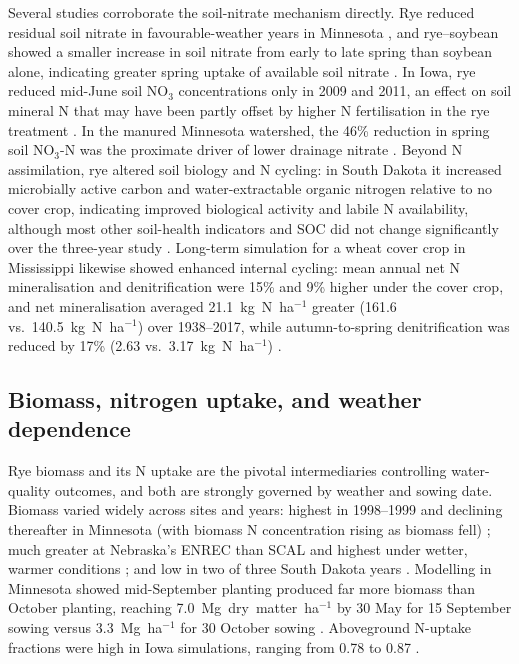 \documentclass[11pt]{article}
\begin{document}
Several studies corroborate the soil-nitrate mechanism directly. Rye reduced residual soil nitrate in favourable-weather years in Minnesota \parencite{Strock2004}, and rye--soybean showed a smaller increase in soil nitrate from early to late spring than soybean alone, indicating greater spring uptake of available soil nitrate \parencite{Qi2011b}. In Iowa, rye reduced mid-June soil NO$_3$ concentrations only in 2009 and 2011, an effect on soil mineral N that may have been partly offset by higher N fertilisation in the rye treatment \parencite{MartinezFeria2016}. In the manured Minnesota watershed, the 46\% reduction in spring soil NO$_3$-N was the proximate driver of lower drainage nitrate \parencite{Krueger2013}. Beyond N assimilation, rye altered soil biology and N cycling: in South Dakota it increased microbially active carbon and water-extractable organic nitrogen relative to no cover crop, indicating improved biological activity and labile N availability, although most other soil-health indicators and SOC did not change significantly over the three-year study \parencite{Bawa2023}. Long-term simulation for a wheat cover crop in Mississippi likewise showed enhanced internal cycling: mean annual net N mineralisation and denitrification were 15\% and 9\% higher under the cover crop, and net mineralisation averaged 21.1~kg~N~ha$^{-1}$ greater (161.6 vs.\ 140.5~kg~N~ha$^{-1}$) over 1938--2017, while autumn-to-spring denitrification was reduced by 17\% (2.63 vs.\ 3.17~kg~N~ha$^{-1}$) \parencite{Yang2021}.

\subsection{Biomass, nitrogen uptake, and weather dependence}
Rye biomass and its N uptake are the pivotal intermediaries controlling water-quality outcomes, and both are strongly governed by weather and sowing date. Biomass varied widely across sites and years: highest in 1998--1999 and declining thereafter in Minnesota (with biomass N concentration rising as biomass fell) \parencite{Strock2004}; much greater at Nebraska's ENREC than SCAL and highest under wetter, warmer conditions \parencite{Birru2023}; and low in two of three South Dakota years \parencite{Bawa2023}. Modelling in Minnesota showed mid-September planting produced far more biomass than October planting, reaching 7.0~Mg~dry~matter~ha$^{-1}$ by 30 May for 15 September sowing versus 3.3~Mg~ha$^{-1}$ for 30 October sowing \parencite{Feyereisen2006b}. Aboveground N-uptake fractions were high in Iowa simulations, ranging from 0.78 to 0.87 \parencite{Malone2018}.
\end{document}
